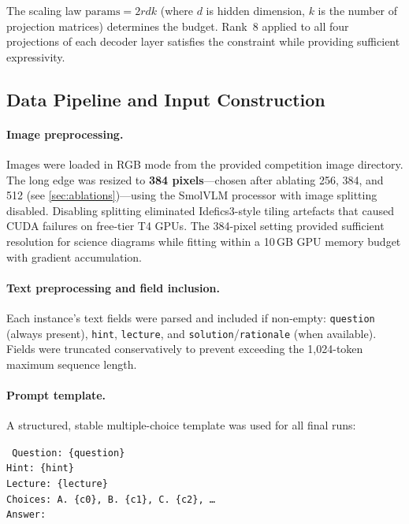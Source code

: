 \documentclass[11pt,twocolumn]{article}
\begin{document}
The scaling law $\text{params} = 2rdk$ (where $d$ is hidden dimension, $k$ is the number of projection matrices) determines the budget. Rank~8 applied to all four projections of each decoder layer satisfies the constraint while providing sufficient expressivity.

\subsection{Data Pipeline and Input Construction}
\label{sec:pipeline}

\paragraph{Image preprocessing.}
Images were loaded in RGB mode from the provided competition image directory. The long edge was resized to \textbf{384 pixels}---chosen after ablating 256, 384, and 512 (see \ref{sec:ablations})---using the SmolVLM processor with image splitting disabled. Disabling splitting eliminated Idefics3-style tiling artefacts that caused CUDA failures on free-tier T4 GPUs. The 384-pixel setting provided sufficient resolution for science diagrams while fitting within a 10\,GB GPU memory budget with gradient accumulation.

\paragraph{Text preprocessing and field inclusion.}
Each instance's text fields were parsed and included if non-empty: \texttt{question} (always present), \texttt{hint}, \texttt{lecture}, and \texttt{solution}/\texttt{rationale} (when available). Fields were truncated conservatively to prevent exceeding the 1,024-token maximum sequence length.

\paragraph{Prompt template.}
A structured, stable multiple-choice template was used for all final runs:

\begin{promptbox}
\small\texttt{%
Question: \{question\}\\
Hint: \{hint\}\\
Lecture: \{lecture\}\\
Choices: A. \{c0\}, B. \{c1\}, C. \{c2\}, \ldots\\
Answer:}
\end{promptbox}
\end{document}
